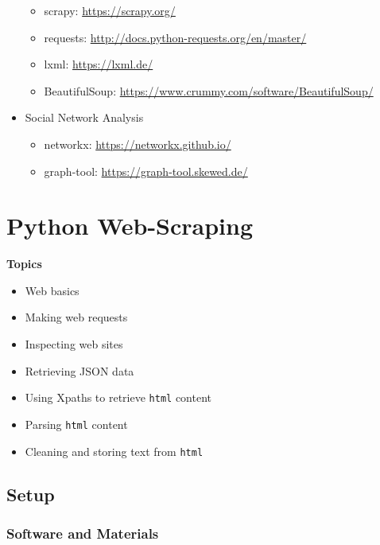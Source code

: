 \documentclass[]{book}
\providecommand{\tightlist}{%
  \setlength{\itemsep}{0pt}\setlength{\parskip}{0pt}}
\begin{document}
\begin{itemize}
  \begin{itemize}
  \tightlist
  \item
    scrapy: \url{https://scrapy.org/}
  \item
    requests: \url{http://docs.python-requests.org/en/master/}
  \item
    lxml: \url{https://lxml.de/}
  \item
    BeautifulSoup: \url{https://www.crummy.com/software/BeautifulSoup/}
  \end{itemize}
\item
  Social Network Analysis

  \begin{itemize}
  \tightlist
  \item
    networkx: \url{https://networkx.github.io/}
  \item
    graph-tool: \url{https://graph-tool.skewed.de/}
  \end{itemize}
\end{itemize}

\hypertarget{python-web-scraping}{%
\chapter{Python Web-Scraping}\label{python-web-scraping}}

\textbf{Topics}

\begin{itemize}
\tightlist
\item
  Web basics
\item
  Making web requests
\item
  Inspecting web sites
\item
  Retrieving JSON data
\item
  Using Xpaths to retrieve \texttt{html} content
\item
  Parsing \texttt{html} content
\item
  Cleaning and storing text from \texttt{html}
\end{itemize}

\hypertarget{setup-5}{%
\section{Setup}\label{setup-5}}

\hypertarget{software-and-materials-5}{%
\subsection{Software and Materials}\label{software-and-materials-5}}
\end{document}
